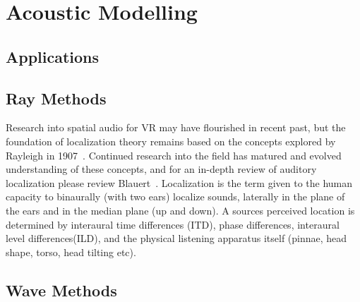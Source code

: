 \documentclass{svproc}
\begin{document}

\section{Acoustic Modelling}
\subsection{Applications}

\subsection{Ray Methods}

Research into spatial audio for VR may have flourished in recent past, but the foundation of localization theory remains based on the concepts explored by Rayleigh in 1907~\cite{Blauert1997}. Continued research into the field has matured and evolved understanding of these concepts, and for an in-depth review of auditory localization please review Blauert~\cite{Blauert1997}. Localization is the term given to the human capacity to binaurally (with two ears) localize sounds, laterally in the plane of the ears and in the median plane (up and down). A sources perceived location is determined by interaural time differences (ITD), phase differences, interaural level differences(ILD), and the physical listening apparatus itself (pinnae, head shape, torso, head tilting etc).




\subsection{Wave Methods}
\end{document}
